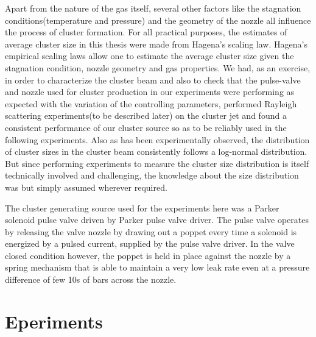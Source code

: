 \documentclass[a4paper,12pt]{article}
\begin{document}
Apart from the nature of the gas itself, several other factors like the stagnation conditions(temperature and pressure) and the geometry of the nozzle all influence the process of cluster formation. For all practical purposes, the estimates of average cluster size in this thesis were made from Hagena's scaling law\cite{clustersourceHagena}. Hagena's empirical scaling laws allow one to estimate the average cluster size given the stagnation condition, nozzle geometry and gas properties. We had, as an exercise, in order to characterize the cluster beam and also to check that the pulse-valve and nozzle used for cluster production in our experiments were performing as expected with the variation of the controlling parameters, performed Rayleigh scattering experiments(to be described later) on the cluster jet and found a consistent performance of our cluster source so as to be reliably used in the following experiments. Also as has been experimentally observed\cite{gspann}, the distribution of cluster sizes in the cluster beam consistently follows a log-normal distribution. But since performing experiments to measure the cluster size distribution is itself technically involved and challenging, the knowledge about the size distribution was but simply assumed wherever required.

The cluster generating source used for the experiments here was a Parker solenoid pulse valve driven by Parker pulse valve driver. The pulse valve operates by releasing the valve nozzle by drawing out a poppet every time a solenoid is energized by a pulsed current, supplied by the pulse valve driver. In the valve closed condition however, the poppet is held in place against the nozzle by a spring mechanism that is able to maintain a very low leak rate even at a pressure difference of few 10s of bars across the nozzle. 

\section{Eperiments}
\end{document}
